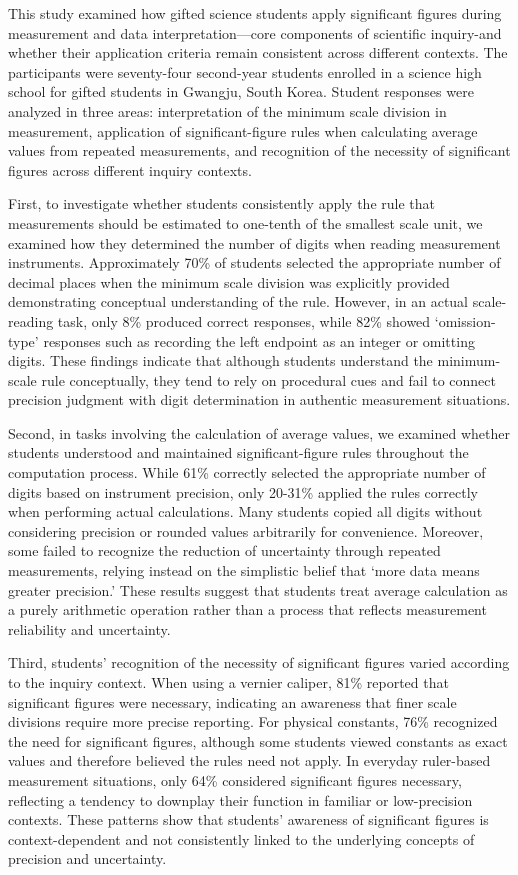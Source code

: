 This study examined how gifted science students apply significant figures
during measurement and data interpretation—core components of scientific
inquiry-and whether their application criteria remain consistent across
different contexts. The participants were seventy-four second-year students
enrolled in a science high school for gifted students in Gwangju, South Korea.
Student responses were analyzed in three areas: interpretation of the minimum
scale division in measurement, application of significant-figure rules when
calculating average values from repeated measurements, and recognition of the
necessity of significant figures across different inquiry contexts.

First, to investigate whether students consistently apply the rule that
measurements should be estimated to one-tenth of the smallest scale unit,
we examined how they determined the number of digits when reading measurement
instruments. Approximately 70\% of students selected the appropriate number of
decimal places when the minimum scale division was explicitly provided
demonstrating conceptual understanding of the rule. However,
in an actual scale-reading task, only 8\% produced correct responses,
while 82\% showed `omission-type' responses such as recording the left endpoint
as an integer or omitting digits. These findings indicate that although students
understand the minimum-scale rule conceptually, they tend to rely on procedural
cues and fail to connect precision judgment with digit determination in authentic
measurement situations.

Second, in tasks involving the calculation of average values, we examined whether
students understood and maintained significant-figure rules throughout the
computation process. While 61\% correctly selected the appropriate number of digits
based on instrument precision, only 20-31\% applied the rules correctly when
performing actual calculations. Many students copied all digits without considering
precision or rounded values arbitrarily for convenience.
Moreover, some failed to recognize the reduction of uncertainty through repeated
measurements, relying instead on the simplistic belief that
`more data means greater precision.' These results suggest that students treat
average calculation as a purely arithmetic operation rather than a process that
reflects measurement reliability and uncertainty.

Third, students' recognition of the necessity of significant figures varied
according to the inquiry context. When using a vernier caliper, 81\% reported that
significant figures were necessary, indicating an awareness that finer scale
divisions require more precise reporting. For physical constants, 76\% recognized
the need for significant figures, although some students viewed constants as exact
values and therefore believed the rules need not apply. In everyday ruler-based
measurement situations, only 64\% considered significant figures necessary,
reflecting a tendency to downplay their function in familiar or low-precision contexts.
These patterns show that students' awareness of significant figures is
context-dependent and not consistently linked to the underlying concepts of precision
and uncertainty.

